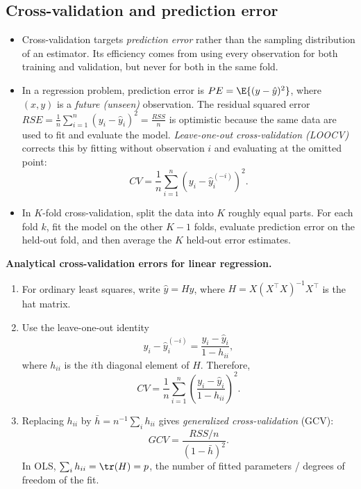 \subsection{Cross-validation and prediction error}
\begin{itemize}
    \item Cross-validation targets \emph{prediction error} rather than the sampling distribution of an estimator. Its efficiency comes from using every observation for both training and validation, but never for both in the same fold.
    \item  In a regression problem, prediction error is $PE=\E\{(y-\hat y)^2\}$, where $(x,y)$ is a \emph{future (unseen)} observation. The residual squared error $RSE=\frac{1}{n}\sum_{i=1}^n (y_i-\hat y_i)^2=\frac{RSS}{n}$ is optimistic because the same data are used to fit and evaluate the model. \emph{Leave-one-out cross-validation (LOOCV)} corrects this by fitting without observation $i$ and evaluating at the omitted point:
    \[
        CV=\frac{1}{n}\sum_{i=1}^n (y_i-\hat y_i^{(-i)})^2.
    \]
    \item In $K$-fold cross-validation, split the data into $K$ roughly equal parts. For each fold $k$, fit the model on the other $K-1$ folds, evaluate prediction error on the held-out fold, and then average the $K$ held-out error estimates.
\end{itemize}


\begin{mybox}
\textbf{Analytical cross-validation errors for linear regression.}
\begin{enumerate}
    \item For ordinary least squares, write $\hat y=Hy$, where $H=X(X^\top X)^{-1}X^\top$ is the hat matrix.
    \item Use the leave-one-out identity
    \[
        y_i-\hat y_i^{(-i)}
        =
        \frac{y_i-\hat y_i}{1-h_{ii}},
    \]
    where $h_{ii}$ is the $i$th diagonal element of $H$. Therefore,
    \[
        CV
        =
        \frac{1}{n}
        \sum_{i=1}^n
        \left(
            \frac{y_i-\hat y_i}{1-h_{ii}}
        \right)^2.
    \]
    \item Replacing $h_{ii}$ by $\bar h=n^{-1}\sum_i h_{ii}$ gives \emph{generalized cross-validation} (GCV):
    \[
        GCV
        =
        \frac{RSS/n}{(1-\bar h)^2}.
    \]
    In OLS, $\sum_i h_{ii}=\tr(H)=p$, the number of fitted parameters / degrees of freedom of the fit.
\end{enumerate}
\end{mybox}

